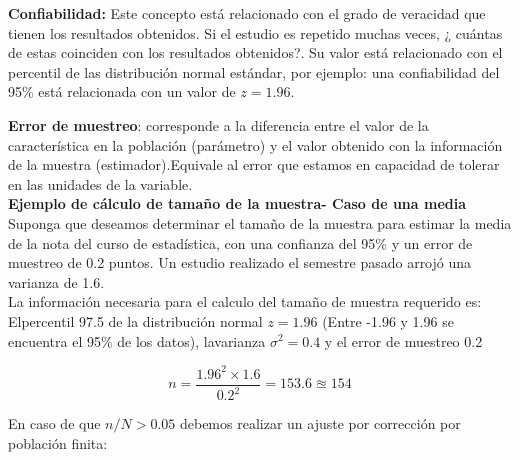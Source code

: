 \documentclass[base=hide,11pt]{elegantbook}
\begin{document}
\textcolor{col4}{\bf \large Confiabilidad:} Este concepto está relacionado con el grado de veracidad que tienen los resultados obtenidos. Si el estudio es repetido muchas veces, ¿ cuántas de estas coinciden con los resultados obtenidos?. Su valor está relacionado con el percentil de las distribución normal estándar, por ejemplo: una confiabilidad del 95\% está relacionada con un valor de $z=1.96$.

\textcolor{col4}{\bf Error de muestreo}: corresponde a la diferencia entre el valor de la característica en la población (parámetro) y el valor obtenido con la información de la muestra (estimador).Equivale al error que estamos en capacidad de tolerar en las unidades de la variable.\\

%		
\textcolor{col3}{\bf \large  Ejemplo de cálculo de tamaño de la muestra- Caso de una media}\\
Suponga que deseamos determinar el tamaño de la muestra para estimar la media de la nota del curso de estadística, con una confianza del 95\% y un error de muestreo de 0.2 puntos. Un estudio realizado el semestre pasado arrojó una varianza de 1.6. \\
		
La información necesaria para el calculo del tamaño de muestra requerido es:
Elpercentil 97.5 de la distribución normal $z=1.96$ (Entre -1.96 y 1.96 se encuentra el 95\% de los datos), lavarianza $\sigma^{2}=0.4$ y el error de muestreo 0.2


$$n=\dfrac{1.96^{2} \times 1.6}{0.2^{2}}=153.6 \approxeq 154$$
		
En caso de que $n/N >0.05$ debemos realizar un ajuste por corrección por población finita:
		
\end{document}

